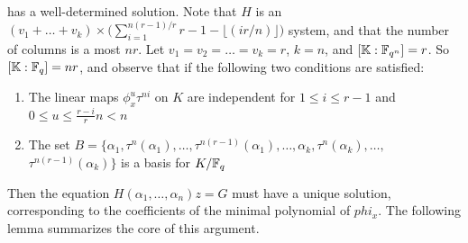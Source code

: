 has a well-determined solution. Note that $H$ is an $ (v_1 + \ldots + v_k) \times \bigg( \sum_{i=1}^{n(r-1)/r} r - 1 - \lfloor(i r/n) \rfloor \bigg)$ system, and that the number of columns is a most $nr$. Let $v_1 = v_2 = \ldots = v_k = r$, $k = n$, and $[\mathbb{K}:\mathbb{F}_{q^n}] = r$. So $[\mathbb{K}:\mathbb{F}_q] = nr$, and observe that if the following two conditions are satisfied:

\begin{enumerate}
    \item The linear maps $\phi_x^{u}\tau^{ni}$ on $K$ are independent for $1 \leq i \leq r-1$ and $0 \leq u \leq  \frac{r-i}{r} n < n$ 
    \item The set $B = \{\alpha_1, \tau^n(\alpha_1), \ldots , \tau^{n(r - 1)}(\alpha_1), \ldots , \alpha_k, \tau^n(\alpha_k), \ldots , $
    $\tau^{n(r - 1)}(\alpha_k) \}$ is a basis for $K/\mathbb{F}_q$
\end{enumerate} 

Then the equation $H(\alpha_1, \ldots, \alpha_{n})z = G$ must have a unique solution, corresponding to the coefficients of the minimal polynomial of $phi_x$. The following lemma summarizes the core of this argument.

